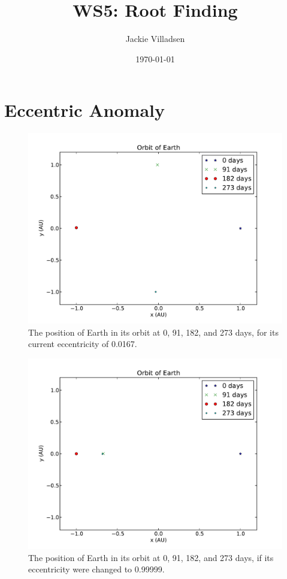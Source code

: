 \documentclass{article}
\begin{document}
\title{WS5: Root Finding}
\author{Jackie Villadsen}
\date{\today}
\maketitle


\section{Eccentric Anomaly}
\begin{figure}[h]
  \begin{center}
     \includegraphics[width=\textwidth]{orbit0167}
  \end{center}
  \caption{The position of Earth in its orbit at 0, 91, 182, and 273 days, for its current eccentricity of 0.0167.}
  \label{fig:low_e}
\end{figure}

\begin{figure}[h]
  \begin{center}
     \includegraphics[width=\textwidth]{orbit99999}
  \end{center}
  \caption{The position of Earth in its orbit at 0, 91, 182, and 273 days, if its eccentricity were changed to 0.99999.}
  \label{fig:high_e}
\end{figure}
\end{document}

